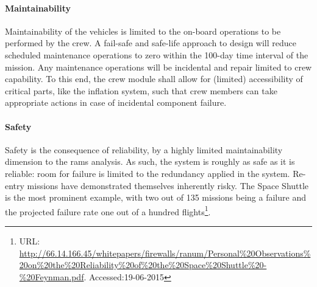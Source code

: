 \paragraph{Maintainability}
Maintainability of the vehicles is limited to the on-board operations to be performed by the crew. A fail-safe and safe-life approach to design will reduce scheduled maintenance operations to zero within the 100-day time interval of the mission. Any maintenance operations will be incidental and repair limited to crew capability. To this end, the crew module shall allow for (limited) accessibility of critical parts, like the inflation system, such that crew members can take appropriate actions in case of incidental component failure.

\paragraph{Safety}
Safety is the consequence of reliability, by a highly limited maintainability dimension to the \gls{rams} analysis. As such, the system is roughly as safe as it is reliable: room for failure is limited to the redundancy applied in the system. Re-entry missions have demonstrated themselves inherently risky. The Space Shuttle is the most prominent example, with two out of 135 missions being a failure and the projected failure rate one out of a hundred flights\footnote{URL: \url{http://66.14.166.45/whitepapers/firewalls/ranum/Personal\%20Observations\%20on\%20the\%20Reliability\%20of\%20the\%20Space\%20Shuttle\%20-\%20Feynman.pdf}. Accessed:19-06-2015}. 